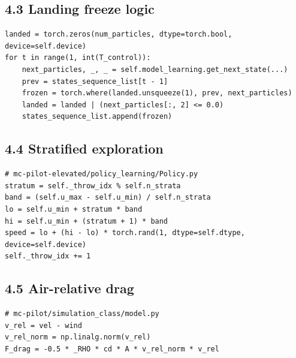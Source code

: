 \documentclass[11pt]{article}
\begin{document}
\subsection*{4.3 Landing freeze logic}
\begin{lstlisting}[style=py]
landed = torch.zeros(num_particles, dtype=torch.bool, device=self.device)
for t in range(1, int(T_control)):
    next_particles, _, _ = self.model_learning.get_next_state(...)
    prev = states_sequence_list[t - 1]
    frozen = torch.where(landed.unsqueeze(1), prev, next_particles)
    landed = landed | (next_particles[:, 2] <= 0.0)
    states_sequence_list.append(frozen)
\end{lstlisting}

\subsection*{4.4 Stratified exploration}
\begin{lstlisting}[style=py]
# mc-pilot-elevated/policy_learning/Policy.py
stratum = self._throw_idx % self.n_strata
band = (self.u_max - self.u_min) / self.n_strata
lo = self.u_min + stratum * band
hi = self.u_min + (stratum + 1) * band
speed = lo + (hi - lo) * torch.rand(1, dtype=self.dtype, device=self.device)
self._throw_idx += 1
\end{lstlisting}

\subsection*{4.5 Air-relative drag}
\begin{lstlisting}[style=py]
# mc-pilot/simulation_class/model.py
v_rel = vel - wind
v_rel_norm = np.linalg.norm(v_rel)
F_drag = -0.5 * _RHO * cd * A * v_rel_norm * v_rel
\end{lstlisting}
\end{document}
